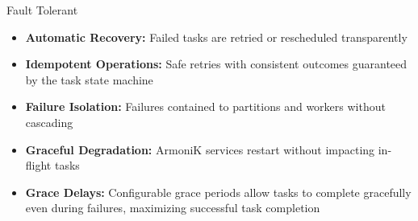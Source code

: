
\begin{frame}{Fault Tolerant}
	\begin{itemize}
		\item \textbf{Automatic Recovery:} Failed tasks are retried or rescheduled transparently
		\item \textbf{Idempotent Operations:} Safe retries with consistent outcomes guaranteed by the task state machine
		\item \textbf{Failure Isolation:} Failures contained to partitions and workers without cascading
		\item \textbf{Graceful Degradation:} ArmoniK services restart without impacting in-flight tasks
		\item \textbf{Grace Delays:} Configurable grace periods allow tasks to complete gracefully even during failures, maximizing successful task completion
	\end{itemize}
\end{frame}

